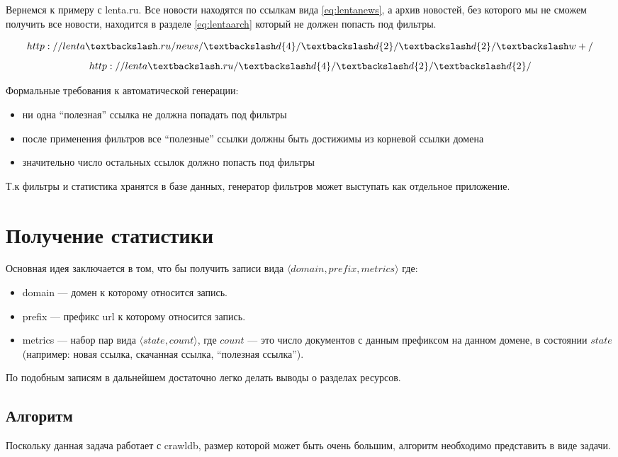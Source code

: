 Вернемся к примеру с lenta.ru. Все новости находятся по ссылкам вида \ref{eq:lentanews}, а архив новостей, без которого мы не сможем получить все новости, находится в разделе \ref{eq:lentaarch} который не должен попасть под фильтры.

\begin{equation}\label{eq:lentanews}
http://lenta\textbackslash.ru/news/\textbackslash d\{4\}/\textbackslash d\{2\}/\textbackslash d\{2\}/\textbackslash w+/
\end{equation}
\begin{equation}\label{eq:lentaarch}
 http://lenta\textbackslash.ru/\textbackslash d\{4\}/\textbackslash d\{2\}/\textbackslash d\{2\}/ 
\end{equation}

Формальные требования к автоматической генерации:
\begin{itemize}
 \item ни одна ``полезная'' ссылка  не должна попадать под фильтры
 \item после применения фильтров все ``полезные'' ссылки должны быть достижимы из корневой ссылки домена
 \item значительно число остальных ссылок должно попасть под фильтры
\end{itemize}

Т.к фильтры и статистика хранятся в базе данных, генератор фильтров может выступать как отдельное приложение.
\section{Получение статистики}
Основная идея заключается в том, что бы получить записи вида $\langle domain,prefix,metrics \rangle$ где:
\begin{itemize}
 \item domain --- домен к которому относится запись.
 \item prefix --- префикс url к которому относится запись.
 \item metrics --- набор пар вида $\langle state, count\rangle$, где $count$ --- это число документов с данным префиксом на данном домене, в состоянии $state$ (например: новая ссылка, скачанная ссылка, ``полезная ссылка'').
\end{itemize}
По подобным записям в дальнейшем достаточно легко делать выводы о разделах ресурсов.
\subsection{Алгоритм}
Поскольку данная задача работает с crawldb, размер которой может быть очень большим, алгоритм необходимо представить в виде   задачи.

